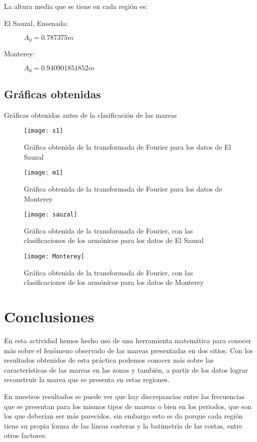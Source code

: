 La altura media que se tiene en cada región es:
\begin{description}
\item [El Sauzal, Ensenada:] $A_0 =0.787375 m$
\item [Monterey:] $A_0 = 0.940901851852 m$
\end{description}
\newpage
\subsection{Gráficas obtenidas}
Gráficas obtenidas antes de la clasificación de las mareas
\begin{figure}[ht!]
\centering
\texttt{[image: s1]}
\caption{Gráfica obtenida de la transformada de Fourier para los datos de El Sauzal}
\label{s1}
\end{figure}

\begin{figure}[ht!]
\centering
\texttt{[image: m1]}
\caption{Gráfica obtenida de la transformada de Fourier para los datos de Monterey}
\label{m1}
\end{figure}

\begin{figure}[ht!]
\centering
\texttt{[image: sauzal]}
\caption{Gráfica obtenida de la transformada de Fourier, con las clasificaciones de los armónicos para los datos de El Sauzal}
\label{szlgfc}
\end{figure}

\begin{figure}[ht!]
\centering
\texttt{[image: Monterey]}
\caption{Gráfica obtenida de la transformada de Fourier, con las clasificaciones de los armónicos para los datos de Monterey}
\label{mtygfc}
\end{figure}

\newpage
\section{Conclusiones}
En esta actividad hemos hecho uso de una herramienta matemática para conocer más sobre el fenómeno observado de las mareas presentadas en dos sitios. Con los resultados obtenidos de esta práctica podemos conocer más sobre las características de las mareas en las zonas y también, a partir de los datos lograr reconstruir la marea que se presenta en estas regiones. 

En nuestros resultados se puede ver que hay discrepancias entre las frecuencias que se presentan para los mismos tipos de mareas o bien en los periodos, que son los que deberían ser más parecidos, sin embargo esto se da porque cada región tiene su propia forma de las líneas costeras y la batimetría de las costas, entre otros factores.

\newpage
\nocite{mareas}
\nocite{noaa}
\nocite{cicese}



